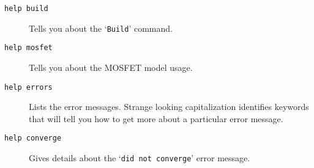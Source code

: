 \begin{description}

\item[{\tt help build}] Tells you about the `{\tt Build}' command.

\item[{\tt help mosfet}] Tells you about the MOSFET model usage.

\item[{\tt help errors}] Lists the error messages.  Strange looking
capitalization identifies keywords that will tell you how to get more about
a particular error message.

\item[{\tt help converge}] Gives details about the `{\tt did not converge}'
error message.

\end{description}

